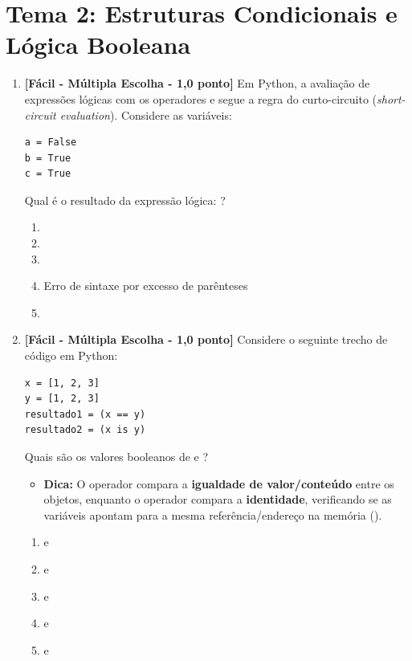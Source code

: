 \section*{Tema 2: Estruturas Condicionais e Lógica Booleana}

\begin{enumerate}[label=\textbf{Q\arabic*.}, start=11]

\item \textbf{[Fácil - Múltipla Escolha - 1,0 ponto]} Em Python, a avaliação de expressões lógicas com os operadores  e  segue a regra do curto-circuito (\emph{short-circuit evaluation}). Considere as variáveis:
\begin{verbatim}
a = False
b = True
c = True
\end{verbatim}
Qual é o resultado da expressão lógica: ?

\begin{enumerate}[label=\textbf{(\Alph*)}]
    \item {}
    \item {}
    \item {}
    \item Erro de sintaxe por excesso de parênteses
    \item {}
\end{enumerate}



\vspace{0.4cm}

\item \textbf{[Fácil - Múltipla Escolha - 1,0 ponto]} Considere o seguinte trecho de código em Python:
\begin{verbatim}
x = [1, 2, 3]
y = [1, 2, 3]
resultado1 = (x == y)
resultado2 = (x is y)
\end{verbatim}
Quais são os valores booleanos de  e ?

\begin{itemize}[leftmargin=*]
    \item \textbf{Dica:} O operador \code{==} compara a \textbf{igualdade de valor/conteúdo} entre os objetos, enquanto o operador  compara a \textbf{identidade}, verificando se as variáveis apontam para a mesma referência/endereço na memória ().
\end{itemize}

\begin{enumerate}[label=\textbf{(\Alph*)}]
    \item {} e 
    \item {} e 
    \item {} e 
    \item {} e 
    \item {} e 
\end{enumerate}


\end{enumerate}
